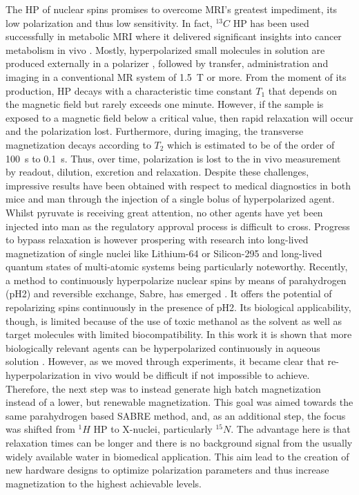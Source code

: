     The HP of nuclear spins promises to overcome MRI's greatest impediment, its low polarization and thus low sensitivity. In fact, $^{13}C$ HP has been used successfully in metabolic MRI where it delivered significant insights into cancer metabolism in vivo \cite{golman_cardiac_2008}. Mostly, hyperpolarized small molecules in solution are produced externally in a polarizer \cite{ardenkjaer-larsen_present_2016}, followed by transfer, administration and imaging in a conventional MR system of \SI{1.5}{\tesla} or more. From the moment of its production, HP decays with a characteristic time constant $T_1$ that depends on the magnetic field but rarely exceeds one minute. However, if the sample is exposed to a magnetic field below a critical value, then rapid relaxation will occur and the polarization lost. Furthermore, during imaging, the transverse magnetization decays according to $T_2$ which is estimated to be of the order of \SI{100}{\second} to  \SI{0.1}{\second}. Thus, over time, polarization is lost to the in vivo measurement by readout, dilution, excretion and relaxation. Despite these challenges, impressive results have been obtained with respect to medical diagnostics in both mice and man through the injection of a single bolus of hyperpolarized agent. Whilst pyruvate is receiving great attention, no other agents have yet been injected into man as the regulatory approval process is difficult to cross. Progress to bypass relaxation is however prospering with research into long-lived magnetization of single nuclei like Lithium-64\cite{van_heeswijk_hyperpolarized_2009} or Silicon-295 \cite{kwiatkowski_nanometer_2017} and long-lived quantum states of multi-atomic systems\cite{pileio_storage_2010, noauthor_y._nodate} being particularly noteworthy. Recently, a method to continuously hyperpolarize  nuclear spins by means of parahydrogen (pH2) and reversible exchange, Sabre, has emerged \cite{adams_reversible_2009-2, hovener_continuous_2014-1}. It offers the potential of repolarizing spins continuously in the presence of pH2. Its biological applicability, though, is limited because of the use of toxic methanol as the solvent as well as target molecules with limited biocompatibility. In this work it is shown that more biologically relevant agents can be hyperpolarized continuously in aqueous solution \cite{truong_irreversible_2014-1}. However, as we moved through experiments, it became clear that re-hyperpolarization in vivo would be difficult if not impossible to achieve. Therefore, the next step was to instead generate high batch magnetization instead of a lower, but renewable magnetization. This goal was aimed towards the same parahydrogen based SABRE method, and, as an additional step, the focus was shifted from $^1H$ HP to X-nuclei, particularly $^{15}N$\cite{truong_15n_2015-1}. The advantage here is that relaxation times can be longer and there is no background signal from the usually widely available water in biomedical application. This aim lead to the creation of new hardware designs to optimize polarization parameters and thus increase magnetization to the highest achievable levels.
